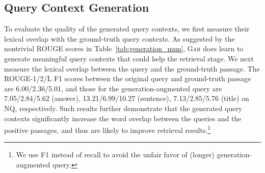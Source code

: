 \documentclass[11pt,a4paper]{article}
\newcommand{\upv}{\vspace{-.0cm}}
\newcommand{\downv}{\vspace{-.1cm}}
\newcommand{\ours}{\textsc{Gar}\xspace}
\begin{document}
\subsection{Query Context Generation}
\label{sec:exp_gen}

To evaluate the quality of the generated query contexts, we first measure their lexical overlap with the ground-truth query contexts.
As suggested by the nontrivial ROUGE scores in Table~\ref{tab:generation_num}, \ours does learn to generate meaningful query contexts that could help the retrieval stage.
We next measure the lexical overlap between the query and the ground-truth passage.
The ROUGE-1/2/L F1 scores between the original query and ground-truth passage are 6.00/2.36/5.01, and those for the generation-augmented query are 7.05/2.84/5.62 (answer), 13.21/6.99/10.27 (sentence), 7.13/2.85/5.76 (title) on NQ, respectively. Such results further demonstrate that the generated query contexts significantly increase the word overlap between the queries and the positive passages, and thus are likely to improve retrieval results.\footnote{We use F1 instead of recall to avoid the unfair favor of (longer) generation-augmented query.}


\begin{table}[ht]
\centering



\upv
\caption{\textbf{ROUGE F1 scores of the generated query contexts} on the validation set of the NQ dataset.
}
\label{tab:generation_num}
\downv
\end{table}
\end{document}
